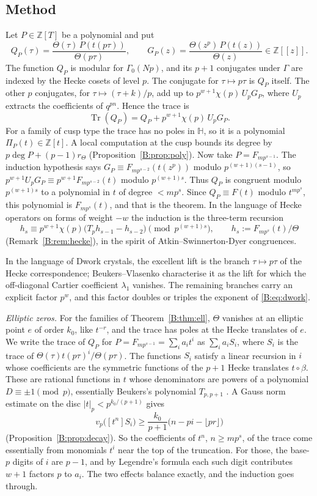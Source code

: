 \documentclass[11pt,a4paper]{article}
\theoremstyle{definition}\newtheorem{definition}[theorem]{Definition}
\theoremstyle{remark}\newtheorem{remark}[theorem]{Remark}
\newcommand{\Z}{\mathbb Z}
\newcommand{\Hb}{\mathbb H}
\DeclareMathOperator{\Tr}{Tr}
\numberwithin{equation}{section}
\begin{document}
\subsection{Method}
Let $P\in\Z[T]$ be a polynomial and put
\[
Q_P(\tau)=\frac{\Theta(\tau)\,P(t(p\tau))}{\Theta(p\tau)},\qquad
G_P(z)=\frac{\Theta(z^p)\,P(t(z))}{\Theta(z)}\in\Z[[z]].
\]
The function $Q_P$ is modular for $\Gamma_0(Np)$, and its $p+1$ conjugates under $\Gamma$ are
indexed by the Hecke cosets of level $p$. The conjugate for $\tau\mapsto p\tau$ is $Q_P$ itself.
The other $p$ conjugates, for $\tau\mapsto(\tau+k)/p$, add up to $p^{w+1}\chi(p)\,U_pG_P$, where
$U_p$ extracts the coefficients of $q^{pn}$. Hence the trace is
\begin{equation}\label{B:eq:key}
\Tr(Q_P)=Q_P+p^{w+1}\chi(p)\,U_pG_P .
\end{equation}
For a family of cusp type the trace has no poles in $\Hb$, so it is a polynomial
$\Pi_P(t)\in\Z[t]$. A local computation at the cusp bounds its degree by $p\deg P+(p-1)r_\Theta$
(Proposition~\ref{B:prop:poly}). Now take $P=F_{mp^{s-1}}$. The induction hypothesis says
$G_P\equiv F_{mp^{s-2}}(t(z^p))$ modulo $p^{(w+1)(s-1)}$, so
$p^{w+1}U_pG_P\equiv p^{w+1}F_{mp^{s-2}}(t)$ modulo $p^{(w+1)s}$. Thus $Q_P$ is congruent modulo
$p^{(w+1)s}$ to a polynomial in $t$ of degree $<mp^s$. Since $Q_P\equiv F(t)$ modulo $t^{mp^s}$,
this polynomial is $F_{mp^s}(t)$, and that is the theorem. In the language of Hecke operators on forms of
weight $-w$ the induction is the three-term recursion
\[
h_s\equiv p^{w+1}\chi(p)\bigl(T_ph_{s-1}-h_{s-2}\bigr)\pmod{p^{(w+1)s}},\qquad
h_s:=F_{mp^s}(t)/\Theta
\]
(Remark~\ref{B:rem:hecke}), in the spirit of Atkin--Swinnerton-Dyer congruences.

In the language of Dwork crystals, the excellent lift is the branch $\tau\mapsto p\tau$ of the
Hecke correspondence; Beukers--Vlasenko characterise it as the lift for which the off-diagonal
Cartier coefficient $\lambda_1$ vanishes. The remaining branches carry an explicit factor $p^w$,
and this factor doubles or triples the exponent of \eqref{B:eq:dwork}.

\emph{Elliptic zeros.} For the families of Theorem~\ref{B:thm:ell}, $\Theta$ vanishes at an elliptic point $e$ of order
$k_0$, like $t^{-r}$, and the trace has poles at the Hecke translates of $e$. We write the trace of $Q_P$ for
$P=F_{mp^{s-1}}=\sum_ia_it^i$ as $\sum_ia_iS_i$, where $S_i$ is the trace of $\Theta(\tau)t(p\tau)^i/\Theta(p\tau)$. The
functions $S_i$ satisfy a linear recursion in $i$ whose coefficients are the symmetric functions of the $p+1$ Hecke
translates $t\circ\beta$. These are rational functions in $t$ whose denominators are powers of a polynomial $D\equiv\pm1\pmod p$,
essentially Beukers's polynomial $T_{p,p+1}$ \cite{Beu26}. A Gauss norm estimate on the disc $|t|_p<p^{k_0/(p+1)}$ gives
\[
v_p\bigl([t^n]S_i\bigr)\ge\frac{k_0}{p+1}\bigl(n-pi-\lfloor pr\rfloor\bigr)
\]
(Proposition~\ref{B:prop:decay}). So the coefficients of $t^n$, $n\ge mp^s$, of the trace come essentially from monomials $t^i$
near the top of the truncation. For those, the base-$p$ digits of $i$ are $p-1$, and by Legendre's formula each such digit
contributes $w+1$ factors $p$ to $a_i$. The two effects balance exactly, and the induction goes through.
\end{document}
